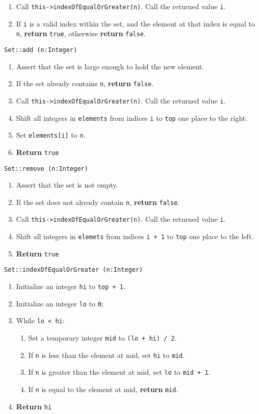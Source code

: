 \begin{enumerate}
	\item Call \texttt{this->indexOfEqualOrGreater(n)}. Call the returned value \texttt{i}. 
	\item If \texttt{i} is a valid index within the set, and the element at that index is equal to \texttt{n},
		\textbf{return} \texttt{true}, otherwise \textbf{return} \texttt{false}.
\end{enumerate}
\vspace{5mm}
\texttt{Set::add (n:Integer)}
\begin{enumerate}
	\item Assert that the set is large enough to hold the new element.
	\item If the set already contains \texttt{n}, \textbf{return} \texttt{false}.
	\item Call \texttt{this->indexOfEqualOrGreater(n)}. Call the returned value \texttt{i}. 
	\item Shift all integers in \texttt{elements} from indices \texttt{i} to \texttt{top} one place to the right.
	\item Set \texttt{elements[i]} to \texttt{n}.
	\item \textbf{Return} \texttt{true} 
\end{enumerate}
\vspace{5mm}
\texttt{Set::remove (n:Integer)}
\begin{enumerate}
	\item Assert that the set is not empty.
	\item If the set does not already contain \texttt{n}, \textbf{return} \texttt{false}.
	\item Call \texttt{this->indexOfEqualOrGreater(n)}. Call the returned value \texttt{i}. 
	\item Shift all integers in \texttt{elemets} from indices \texttt{i + 1} to \texttt{top} one place to the left.
	\item \textbf{Return} \texttt{true} 
\end{enumerate}
\vspace{5mm}
\texttt{Set::indexOfEqualOrGreater (n:Integer)}
\begin{enumerate}
	\item Initialize an integer \texttt{hi} to \texttt{top + 1}.
	\item Initialize an integer \texttt{lo} to \texttt{0};
	\item While \texttt{lo < hi}:
	\begin{enumerate}
		\item Set a temporary integer \texttt{mid} to \texttt{(lo + hi) / 2}.
		\item If \texttt{n} is less than the element at mid, set \texttt{hi} to \texttt{mid}. 
		\item If \texttt{n} is greater than the element at mid, set \texttt{lo} to \texttt{mid + 1}.
		\item If \texttt{n} is equal to the element at mid, \textbf{return} \texttt{mid}.
	\end{enumerate}
	\item \textbf{Return} \texttt{hi}
\end{enumerate}

